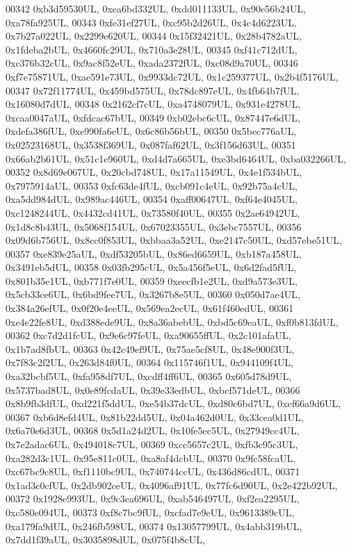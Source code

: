 \begin{DoxyCode}
00342     0xb3d59530UL, 0xea6bd332UL, 0xdd011133UL, 0x90e56b24UL, 0xa78fa925UL,
00343     0xfe31ef27UL, 0xc95b2d26UL, 0x4c4d6223UL, 0x7b27a022UL, 0x2299e620UL,
00344     0x15f32421UL, 0x28b4782aUL, 0x1fdeba2bUL, 0x4660fc29UL, 0x710a3e28UL,
00345     0xf41c712dUL, 0xc376b32cUL, 0x9ac8f52eUL, 0xada2372fUL, 0xc08d9a70UL,
00346     0xf7e75871UL, 0xae591e73UL, 0x9933dc72UL, 0x1c259377UL, 0x2b4f5176UL,
00347     0x72f11774UL, 0x459bd575UL, 0x78dc897eUL, 0x4fb64b7fUL, 0x16080d7dUL,
00348     0x2162cf7cUL, 0xa4748079UL, 0x931e4278UL, 0xcaa0047aUL, 0xfdcac67bUL,
00349     0xb02ebc6cUL, 0x87447e6dUL, 0xdefa386fUL, 0xe990fa6eUL, 0x6c86b56bUL,
00350     0x5bec776aUL, 0x02523168UL, 0x3538f369UL, 0x087faf62UL, 0x3f156d63UL,
00351     0x66ab2b61UL, 0x51c1e960UL, 0xd4d7a665UL, 0xe3bd6464UL, 0xba032266UL,
00352     0x8d69e067UL, 0x20cbd748UL, 0x17a11549UL, 0x4e1f534bUL, 0x7975914aUL,
00353     0xfc63de4fUL, 0xcb091c4eUL, 0x92b75a4cUL, 0xa5dd984dUL, 0x989ac446UL,
00354     0xaff00647UL, 0xf64e4045UL, 0xc1248244UL, 0x4432cd41UL, 0x73580f40UL,
00355     0x2ae64942UL, 0x1d8c8b43UL, 0x5068f154UL, 0x67023355UL, 0x3ebc7557UL,
00356     0x09d6b756UL, 0x8cc0f853UL, 0xbbaa3a52UL, 0xe2147c50UL, 0xd57ebe51UL,
00357     0xe839e25aUL, 0xdf53205bUL, 0x86ed6659UL, 0xb187a458UL, 0x3491eb5dUL,
00358     0x03fb295cUL, 0x5a456f5eUL, 0x6d2fad5fUL, 0x801b35e1UL, 0xb771f7e0UL,
00359     0xeecfb1e2UL, 0xd9a573e3UL, 0x5cb33ce6UL, 0x6bd9fee7UL, 0x3267b8e5UL,
00360     0x050d7ae4UL, 0x384a26efUL, 0x0f20e4eeUL, 0x569ea2ecUL, 0x61f460edUL,
00361     0xe4e22fe8UL, 0xd388ede9UL, 0x8a36abebUL, 0xbd5c69eaUL, 0xf0b813fdUL,
00362     0xc7d2d1fcUL, 0x9e6c97feUL, 0xa90655ffUL, 0x2c101afaUL, 0x1b7ad8fbUL,
00363     0x42c49ef9UL, 0x75ae5cf8UL, 0x48e900f3UL, 0x7f83c2f2UL, 0x263d84f0UL,
00364     0x115746f1UL, 0x944109f4UL, 0xa32bcbf5UL, 0xfa958df7UL, 0xcdff4ff6UL,
00365     0x605d78d9UL, 0x5737bad8UL, 0x0e89fcdaUL, 0x39e33edbUL, 0xbcf571deUL,
00366     0x8b9fb3dfUL, 0xd221f5ddUL, 0xe54b37dcUL, 0xd80c6bd7UL, 0xef66a9d6UL,
00367     0xb6d8efd4UL, 0x81b22dd5UL, 0x04a462d0UL, 0x33cea0d1UL, 0x6a70e6d3UL,
00368     0x5d1a24d2UL, 0x10fe5ec5UL, 0x27949cc4UL, 0x7e2adac6UL, 0x494018c7UL,
00369     0xcc5657c2UL, 0xfb3c95c3UL, 0xa282d3c1UL, 0x95e811c0UL, 0xa8af4dcbUL,
00370     0x9fc58fcaUL, 0xc67bc9c8UL, 0xf1110bc9UL, 0x740744ccUL, 0x436d86cdUL,
00371     0x1ad3c0cfUL, 0x2db902ceUL, 0x4096af91UL, 0x77fc6d90UL, 0x2e422b92UL,
00372     0x1928e993UL, 0x9c3ea696UL, 0xab546497UL, 0xf2ea2295UL, 0xc580e094UL,
00373     0xf8c7bc9fUL, 0xcfad7e9eUL, 0x9613389cUL, 0xa179fa9dUL, 0x246fb598UL,
00374     0x13057799UL, 0x4abb319bUL, 0x7dd1f39aUL, 0x3035898dUL, 0x075f4b8cUL,

\end{DoxyCode}
